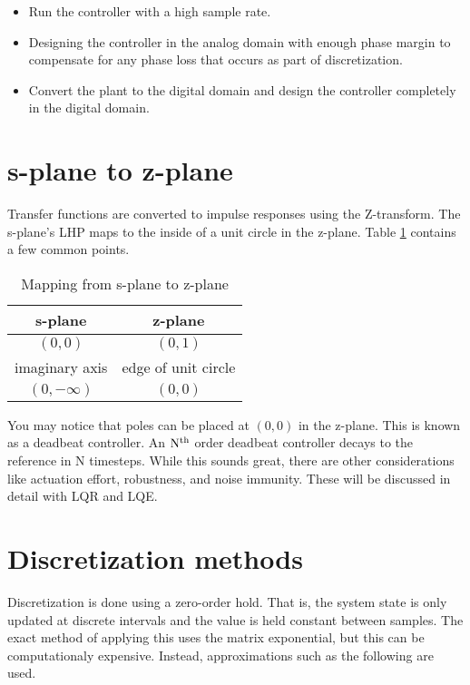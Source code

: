 \begin{itemize}
  \item Run the controller with a high sample rate.
  \item Designing the controller in the analog domain with enough phase margin
    to compensate for any phase loss that occurs as part of discretization.
  \item Convert the \gls{plant} to the digital domain and design the controller
    completely in the digital domain.
\end{itemize}

\section{s-plane to z-plane}

Transfer functions are converted to impulse responses using the Z-transform. The
s-plane's LHP maps to the inside of a unit circle in the z-plane. Table
\ref{tab:s-plane2z-plane} contains a few common points.

\begin{table}
  \renewcommand{\arraystretch}{1.3}
  \centering
  \begin{tabular}{|cc|}
    \hline
    \rowcolor{headingbg}
    \textbf{s-plane} & \textbf{z-plane} \\
    \hline
    $(0, 0)$ & $(0, 1)$ \\
    imaginary axis & edge of unit circle \\
    $(0, -\infty)$ & $(0, 0)$ \\
    \hline
  \end{tabular}
  \caption{Mapping from s-plane to z-plane}
  \label{tab:s-plane2z-plane}
\end{table}

You may notice that poles can be placed at $(0, 0)$ in the z-plane. This is
known as a deadbeat controller. An $\rm N^{th}$ order deadbeat controller decays
to the \gls{reference} in N timesteps. While this sounds great, there are other
considerations like actuation effort, \gls{robustness}, and
\gls{noise immunity}. These will be discussed in detail with LQR and LQE.

\section{Discretization methods}

Discretization is done using a zero-order hold. That is, the system state is
only updated at discrete intervals and the value is held constant between
samples. The exact method of applying this uses the matrix exponential, but this
can be computationaly expensive. Instead, approximations such as the following
are used.

